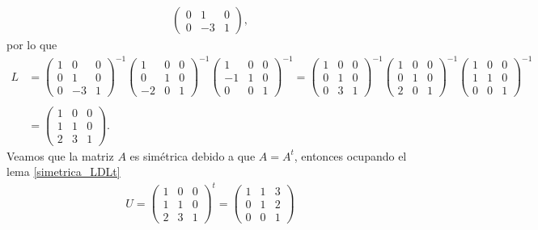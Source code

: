 \documentclass[11pt,letterpaper]{article}
\begin{document}
\begin{enumerate}
\begin{align*}
\begin{pmatrix}
0 & 1 & 0\\
0 & -3 & 1
\end{pmatrix},
\end{align*}
por lo que
\begin{align*}
L&=\begin{pmatrix}
1 & 0 & 0 \\
0 & 1 & 0\\
0 & -3 & 1
\end{pmatrix}^{-1}\begin{pmatrix}
 1 & 0 & 0 \\
 0 & 1 & 0\\
-2 & 0 & 1
\end{pmatrix}^{-1}\begin{pmatrix}
 1 & 0 & 0 \\
-1 & 1 & 0\\
 0 & 0 & 1
\end{pmatrix}^{-1}=
\begin{pmatrix}
1 & 0 & 0 \\
0 & 1 & 0\\
0 & 3 & 1
\end{pmatrix}^{-1}\begin{pmatrix}
 1 & 0 & 0 \\
 0 & 1 & 0\\
 2 & 0 & 1
\end{pmatrix}^{-1}\begin{pmatrix}
 1 & 0 & 0 \\
 1 & 1 & 0\\
 0 & 0 & 1
\end{pmatrix}^{-1}\\ \\
&=\begin{pmatrix}
 1 & 0 & 0 \\
 1 & 1 & 0\\
 2 & 3 & 1
\end{pmatrix}.
\end{align*}
Veamos que la matriz $A$ es simétrica debido a que $A=A^t$, entonces ocupando el lema \ref{simetrica_LDLt} 
\begin{align*}
U = \begin{pmatrix}
 1 & 0 & 0 \\
 1 & 1 & 0\\
 2 & 3 & 1
\end{pmatrix}^{t} =
\begin{pmatrix}
 1 & 1 & 3 \\
 0 & 1 & 2\\
 0 & 0 & 1
\end{pmatrix} 

\end{align*}
\end{enumerate}
\end{document}
